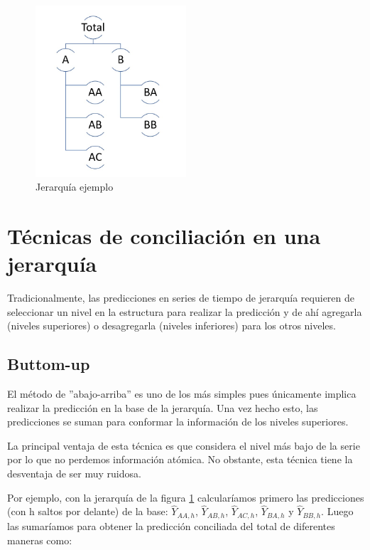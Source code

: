 \begin{figure}
    \centering
    \includegraphics[width=0.5\textwidth]{imgs/jerar_ex.jpg}
    \caption{Jerarquía ejemplo}
    \label{fig:jerar_ex}
\end{figure}

\section{Técnicas de conciliación en una jerarquía}

Tradicionalmente, las predicciones en series de tiempo de jerarquía requieren de seleccionar un nivel en la estructura para realizar la predicción y de ahí agregarla (niveles superiores) o desagregarla (niveles inferiores) para los otros niveles. 

\subsection{Buttom-up}

El método de ''abajo-arriba'' es uno de los más simples pues únicamente implica realizar la predicción en la base de la jerarquía. Una vez hecho esto, las predicciones se suman para conformar la información de los niveles superiores.

La principal ventaja de esta técnica es que considera el nivel más bajo de la serie por lo que no perdemos información atómica. No obstante, esta técnica tiene la desventaja de ser muy ruidosa.

Por ejemplo, con la jerarquía de la figura \ref{fig:jerar_ex} calcularíamos primero las predicciones (con h saltos por delante) de la base: $\hat{Y}_{AA,h}$, $\hat{Y}_{AB,h}$, $\hat{Y}_{AC,h}$, $\hat{Y}_{BA,h}$ y $\hat{Y}_{BB,h}$. Luego las sumaríamos para obtener la predicción conciliada del total de diferentes maneras como:

